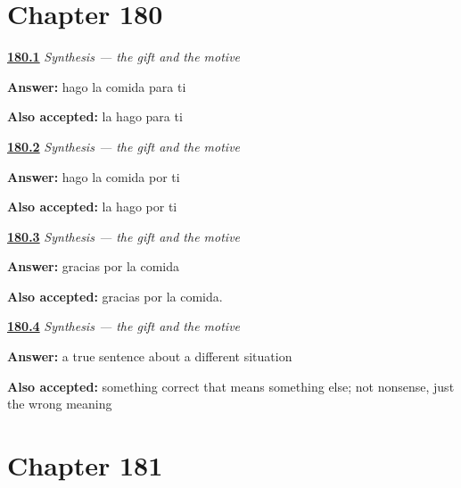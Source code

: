 \section*{Chapter 180}

\noindent\begin{minipage}[t]{\linewidth}
\raggedright
\hyperlink{review-ES-C51-sintesis-regalo-motivo-gift}{\textbf{180.1}} \emph{Synthesis — the gift and the motive}\par
\small \textbf{Answer:} hago la comida para ti\par
\footnotesize \textbf{Also accepted:} la hago para ti
\end{minipage}\par\medskip

\noindent\begin{minipage}[t]{\linewidth}
\raggedright
\hyperlink{review-ES-C51-sintesis-regalo-motivo-cause}{\textbf{180.2}} \emph{Synthesis — the gift and the motive}\par
\small \textbf{Answer:} hago la comida por ti\par
\footnotesize \textbf{Also accepted:} la hago por ti
\end{minipage}\par\medskip

\noindent\begin{minipage}[t]{\linewidth}
\raggedright
\hyperlink{review-ES-C51-sintesis-regalo-motivo-thanks}{\textbf{180.3}} \emph{Synthesis — the gift and the motive}\par
\small \textbf{Answer:} gracias por la comida\par
\footnotesize \textbf{Also accepted:} gracias por la comida.
\end{minipage}\par\medskip

\noindent\begin{minipage}[t]{\linewidth}
\raggedright
\hyperlink{review-ES-C51-sintesis-regalo-motivo-wrong}{\textbf{180.4}} \emph{Synthesis — the gift and the motive}\par
\small \textbf{Answer:} a true sentence about a different situation\par
\footnotesize \textbf{Also accepted:} something correct that means something else; not nonsense, just the wrong meaning
\end{minipage}\par\medskip

\section*{Chapter 181}

